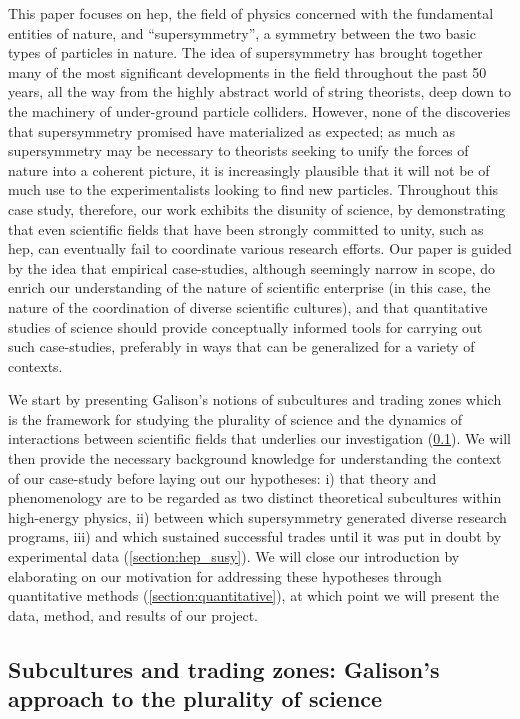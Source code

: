 \documentclass[smallextended]{svjour3}
\begin{document}
This paper focuses on \gls{hep}, the field of physics concerned with the fundamental entities of nature, and ``supersymmetry'', a symmetry between the two basic types of particles in nature. The idea of supersymmetry has brought together many of the most significant developments in the field throughout the past 50 years, all the way from the highly abstract world of string theorists, deep down to the machinery of under-ground particle colliders. However, none of the discoveries that supersymmetry promised have materialized as expected; as much as supersymmetry may be necessary to theorists seeking to unify the forces of nature into a coherent picture, it is increasingly plausible that it will not be of much use to the experimentalists looking to find new particles. Throughout this case study, therefore, our work exhibits the disunity of science, by demonstrating that even scientific fields that have been strongly committed to unity, such as \gls{hep}, can eventually fail to coordinate various research efforts. Our paper is guided by the idea that empirical case-studies, although seemingly narrow in scope, do enrich our understanding of the nature of scientific enterprise (in this case, the nature of the coordination of diverse scientific cultures), and that quantitative studies of science should provide conceptually informed tools for carrying out such case-studies, preferably in ways that can be generalized for a variety of contexts. %

We start by presenting Galison's notions of subcultures and trading zones which is the framework for studying the plurality of science and the dynamics of interactions between scientific fields that underlies our investigation 
(\ref{section:galison}). We will then provide the necessary background knowledge for understanding the context of our case-study before laying out our hypotheses: i) that theory and phenomenology are to be regarded as two distinct theoretical subcultures within high-energy physics, ii) between which supersymmetry generated diverse research programs, iii) and which sustained successful trades until it was put in doubt by experimental data (\ref{section:hep_susy}). We will close our introduction by elaborating on our motivation for addressing these hypotheses through quantitative methods (\ref{section:quantitative}), at which point we will present the data, method, and results of our project.


\subsection{Subcultures and trading zones: Galison's approach to the plurality of science}\label{section:galison}
\end{document}
